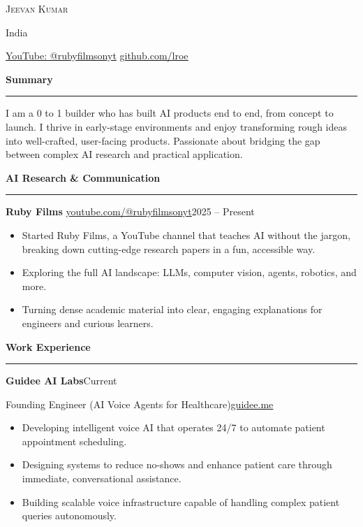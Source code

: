 \documentclass[10pt,a4paper]{article}
\newcommand{\cvsection}[1]{%
  \par\vspace{14pt}%
  {\large\bfseries #1\par}%
  \vspace{-7.2pt}%
  \noindent\rule{\linewidth}{0.4pt}\par
  \vspace{-1pt}%
}
\newcommand{\entry}[4]{%
  {\bfseries #1}\hfill #4\par
  \vspace{1pt}%
  #2\hfill #3\par
  \vspace{1pt}%
}
\begin{document}
\begingroup
\centering
{\Huge\scshape Jeevan Kumar\par}
\vspace{4.9pt}
{\normalsize India\par}
\vspace{4.9pt}
{\normalsize
\href{https://www.youtube.com/@rubyfilmsonyt}{\underline{YouTube: @rubyfilmsonyt}} \textbar{}
\href{https://github.com/lroe}{\underline{github.com/lroe}}\par}
\endgroup

\cvsection{Summary}
I am a 0 to 1 builder who has built AI products end to end, from concept to launch. I thrive in early-stage environments
and enjoy transforming rough ideas into well-crafted, user-facing products. Passionate about bridging the gap between
complex AI research and practical application.

\cvsection{AI Research \& Communication}
\vspace{4.5pt}
{\bfseries Ruby Films} \textbar{} \href{https://www.youtube.com/@rubyfilmsonyt}{\underline{youtube.com/@rubyfilmsonyt}}\hfill 2025 -- Present\par
\vspace{1pt}
\begin{itemize}
  \item Started Ruby Films, a YouTube channel that teaches AI without the jargon, breaking down cutting-edge research papers in a fun, accessible way.
  \item Exploring the full AI landscape: LLMs, computer vision, agents, robotics, and more.
  \item Turning dense academic material into clear, engaging explanations for engineers and curious learners.
\end{itemize}

\cvsection{Work Experience}
\entry{Guidee AI Labs}{Founding Engineer (AI Voice Agents for Healthcare)}{\href{https://guidee.me}{\underline{guidee.me}}}{Current}
\begin{itemize}
  \item Developing intelligent voice AI that operates 24/7 to automate patient appointment scheduling.
  \item Designing systems to reduce no-shows and enhance patient care through immediate, conversational assistance.
  \item Building scalable voice infrastructure capable of handling complex patient queries autonomously.
\end{itemize}
\end{document}
